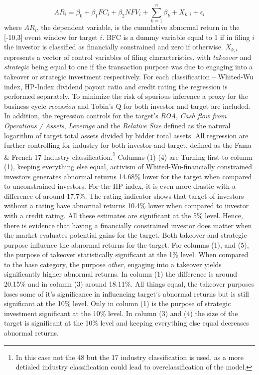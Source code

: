 \documentclass[12pt]{article}
\begin{document}
\begin{equation}
	AR_{i}=\beta_{0}+\beta_{1}FC_{i}+\beta_{2}NFV_{i}+\sum_{k=1}^{n}\beta_{k}+X_{k,i}+\epsilon_{i}
\end{equation}
where $AR_{i}$, the dependent variable, is the cumulative abnormal return in the [-10,3] event window for target $i$. BFC is a dummy variable equal to 1 if in filing $i$ the investor is classified as financially constrained and zero if otherwise. $X_{k,i}$ represents a vector of control variables of filing characteristics, with \emph{takeover} and \emph{strategic} being equal to one if the transaction purpose was due to engaging into a takeover or strategic investment respectively. For each classification -- Whited-Wu index, HP-Index dividend payout ratio and credit rating the regression is performed separately. To minimize the risk of spurious inference a proxy for the business cycle \emph{recession} and Tobin's Q for both investor and target are included. In addition, the regression controls for the target's \emph{ROA}, \emph{Cash flow from Operations / Assets}, \emph{Leverage} and the \emph{Relative Size} defined as the natural logarithm of target total assets divided by bidder total assets. All regression are further controlling for industry for both investor and target, defined as the Fama \& French 17 Industry classification.\footnote{In this case not the 48 but the 17 industry classification is used, as a more detialed industry classification could lead to overclassification of the model.} 
Columns (1)-(4) are 
Turning first to column (1), keeping everything else equal, activism of Whited-Wu-financially constrained investors generates  abnormal returns 14.68\% lower for the target when compared to unconstrained investors. For the HP-index, it is even more drastic with a difference of around 17.7\%. The rating indicator shows that target of investors without a rating have abnormal returns 10.4\% lower when compared to investor with a credit rating. All these estimates are significant at the 5\% level. Hence, there is evidence that having a financially constrained investor does matter when the market evaluates potential gains for the target. Both takeover and strategic purpose influence the abnormal returns for the target. For columns (1), and (5), the purpose of takeover statistically significant at the 1\% level. When compared to the base category, the purpose \emph{other}, engaging into a takeover yields significantly higher abnormal returns. In column (1) the difference is around 20.15\% and in column (3) around 18.11\%. All things equal, the takeover purposes loses some of it's significance in influencing target's abnormal returns but is still significant at the 10\% level. Only in column (1) is the purpose of strategic investment significant at the 10\% level. In column (3) and (4) the size of the target is significant at the 10\% level and keeping everything else equal decreases abnormal returns.
\end{document}
